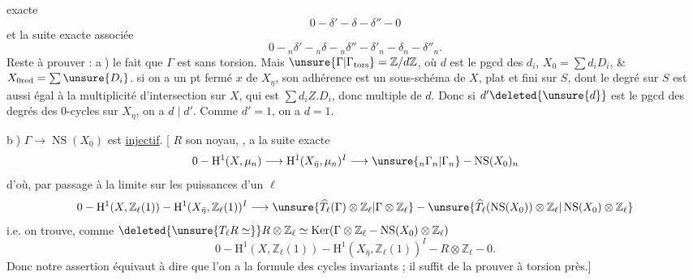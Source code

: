exacte
\[
0\mathbin{-}\delta'\mathbin{-}\delta\mathbin{-}\delta''\mathbin{-}0
\]
et la suite exacte associée
\[
0\mathbin{-}{}_n\delta'\mathbin{-}{}_n\delta\mathbin{-}{}_n\delta''\mathbin{-}\delta'_n\mathbin{-}\delta_n\mathbin{-}\delta''_n.
\]
Reste à prouver : \textcircled{a}) le fait que $\Gamma$ est sans torsion. Mais $\unsure{\Gamma|\Gamma_{\mathrm{tors}}}=\mathbb Z/d\mathbb Z$, où $d$ est le pgcd des $d_i$, $X_0=\sum d_iD_i$, \& $X_{0\mathrm{red}}=\sum\unsure{D_i}$.  si on a un pt fermé $x$ de $X_\eta$, son adhérence  est un sous-schéma   de $X$, plat et fini sur $S$,  dont le degré sur $S$ est aussi égal à la multiplicité d'intersection  sur $X$, qui est $\sum d_iZ.D_i$, donc multiple de $d$. Donc si $d'\deleted{\unsure{d}}$ est le pgcd des degrés des 0-cycles sur $X_\eta$, on a $d\mid d'$. Comme $d'=1$, on a $d=1$.

\textcircled{b}) $\Gamma\longrightarrow\operatorname{NS}(X_0)$ est \uline{injectif}.
[ $R$ son noyau, ,  a la suite exacte
\[
0\mathbin{-}\mathrm H^1(X,\mu_n)\longrightarrow\mathrm H^1(X_{\bar\eta},\mu_n)^I\longrightarrow\unsure{{}_n\Gamma_n|\Gamma_n}\mathbin{-}\operatorname{NS}(X_0)_n
\]
d'où, par passage à la limite sur les puissances d'un $\ell$
\[
0\mathbin{-}\mathrm H^1(X,\mathbb Z_\ell(1))\mathbin{-}\mathrm H^1(X_{\bar\eta},\mathbb Z_\ell(1))^I\longrightarrow\unsure{\widehat{T}_\ell(\Gamma)\otimes\mathbb Z_\ell|\Gamma\otimes\mathbb Z_\ell}\mathbin{-}\unsure{\widehat{T}_\ell(\operatorname{NS}(X_0))\otimes\mathbb Z_\ell|\operatorname{NS}(X_0)\otimes\mathbb Z_\ell}
\]
i.e. on trouve, comme $\deleted{\unsure{T_\ell R\simeq}}R\otimes\mathbb Z_\ell\simeq\operatorname{Ker}(\Gamma\otimes\mathbb Z_\ell\mathbin{-}\operatorname{NS}(X_0)\otimes\mathbb Z_\ell)$
\quad\unsure{$\rho$}
\[
0\mathbin{-}\mathrm H^1(X,\mathbb Z_\ell(1))\mathbin{-}\mathrm H^1(X_{\bar\eta},\mathbb Z_\ell(1))^I\mathbin{-}R\otimes\mathbb Z_\ell\mathbin{-}0.
\]
Donc notre assertion équivaut à dire que l'on a la formule des cycles invariants ;  il suffit de la prouver à torsion près.]

